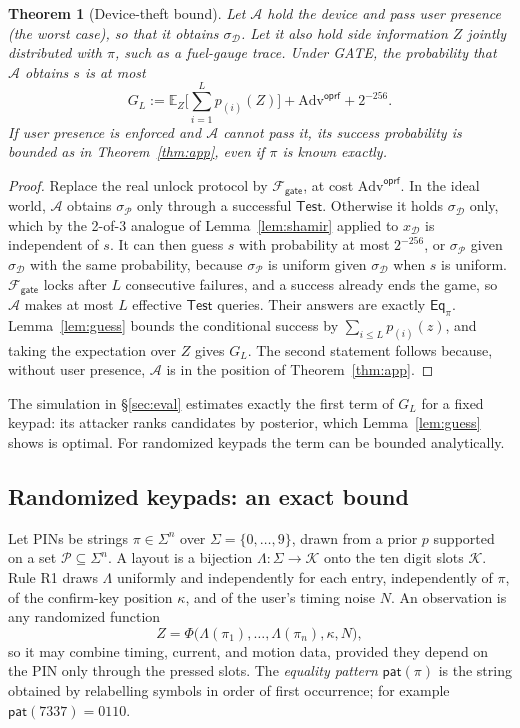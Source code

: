 \documentclass[11pt]{article}
\newtheorem{theorem}{Theorem}
\theoremstyle{remark}
\begin{document}
\begin{theorem}[Device-theft bound]
\label{prop:pin}
Let $\mathcal{A}$ hold the device and pass user presence (the worst case), so that it obtains $\sigma_{\mathcal{D}}$. Let it also hold side information $Z$ jointly distributed with $\pi$, such as a fuel-gauge trace. Under GATE, the probability that $\mathcal{A}$ obtains $s$ is at most
\[
G_L := \mathbb{E}_Z\Big[\sum_{i=1}^{L} p_{(i)}(Z)\Big] + \mathrm{Adv}^{\mathsf{oprf}} + 2^{-256}.
\]
If user presence is enforced and $\mathcal{A}$ cannot pass it, its success probability is bounded as in Theorem~\ref{thm:app}, even if $\pi$ is known exactly.
\end{theorem}
\begin{proof}
Replace the real unlock protocol by $\mathcal{F}_{\mathsf{gate}}$, at cost $\mathrm{Adv}^{\mathsf{oprf}}$. In the ideal world, $\mathcal{A}$ obtains $\sigma_{\mathcal{P}}$ only through a successful $\mathsf{Test}$. Otherwise it holds $\sigma_{\mathcal{D}}$ only, which by the 2-of-3 analogue of Lemma~\ref{lem:shamir} applied to $x_{\mathcal{D}}$ is independent of $s$. It can then guess $s$ with probability at most $2^{-256}$, or $\sigma_{\mathcal{P}}$ given $\sigma_{\mathcal{D}}$ with the same probability, because $\sigma_{\mathcal{P}}$ is uniform given $\sigma_{\mathcal{D}}$ when $s$ is uniform. $\mathcal{F}_{\mathsf{gate}}$ locks after $L$ consecutive failures, and a success already ends the game, so $\mathcal{A}$ makes at most $L$ effective $\mathsf{Test}$ queries. Their answers are exactly $\mathsf{Eq}_\pi$. Lemma~\ref{lem:guess} bounds the conditional success by $\sum_{i \le L} p_{(i)}(z)$, and taking the expectation over $Z$ gives $G_L$. The second statement follows because, without user presence, $\mathcal{A}$ is in the position of Theorem~\ref{thm:app}.
\end{proof}

The simulation in §\ref{sec:eval} estimates exactly the first term of $G_L$ for a fixed keypad: its attacker ranks candidates by posterior, which Lemma~\ref{lem:guess} shows is optimal. For randomized keypads the term can be bounded analytically.

\subsection{Randomized keypads: an exact bound}

Let PINs be strings $\pi \in \Sigma^n$ over $\Sigma = \{0,\dots,9\}$, drawn from a prior $p$ supported on a set $\mathcal{P} \subseteq \Sigma^n$. A layout is a bijection $\Lambda: \Sigma \to \mathcal{K}$ onto the ten digit slots $\mathcal{K}$. Rule R1 draws $\Lambda$ uniformly and independently for each entry, independently of $\pi$, of the confirm-key position $\kappa$, and of the user's timing noise $N$. An observation is any randomized function
\[
Z = \Phi\big(\Lambda(\pi_1), \dots, \Lambda(\pi_n), \kappa, N\big),
\]
so it may combine timing, current, and motion data, provided they depend on the PIN only through the pressed slots. The \emph{equality pattern} $\mathsf{pat}(\pi)$ is the string obtained by relabelling symbols in order of first occurrence; for example $\mathsf{pat}(7337) = 0110$.
\end{document}
